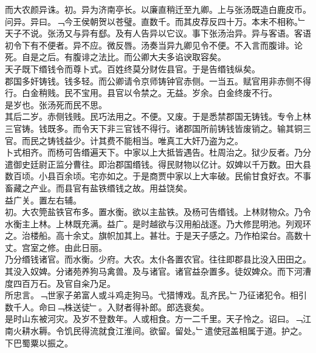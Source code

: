 \documentclass{zhvt-classic}
\begin{document}
\hspace*{2em}而大农颜异诛。初。异为济南亭长。以廉直稍迁至九卿。上与张汤既造白鹿皮币。问异。异曰。﹁今王侯朝贺以苍璧。直数千。而其皮荐反四十万。本末不相称。﹂天子不说。张汤又与异有郄。及有人告异以它议。事下张汤治异。异与客语。客语初令下有不便者。异不应。微反唇。汤奏当异九卿见令不便。不入言而腹诽。论死。自是之后。有腹诽之法比。而公卿大夫多谄谀取容矣。\\
\hspace*{2em}天子既下缗钱令而尊卜式。百姓终莫分财佐县官。于是告缗钱纵矣。\\
\hspace*{2em}郡国多奸铸钱。钱多轻。而公卿请令京师铸钟官赤侧。一当五。赋官用非赤侧不得行。白金稍贱。民不宝用。县官以令禁之。无益。岁余。白金终废不行。\\
\hspace*{2em}是岁也。张汤死而民不思。\\
\hspace*{2em}其后二岁。赤侧钱贱。民巧法用之。不便。又废。于是悉禁郡国无铸钱。专令上林三官铸。钱既多。而令天下非三官钱不得行。诸郡国所前铸钱皆废销之。输其铜三官。而民之铸钱益少。计其费不能相当。唯真工大奸乃盗为之。\\
\hspace*{2em}卜式相齐。而杨可告缗遍天下。中家以上大抵皆遇告。杜周治之。狱少反者。乃分遣御史廷尉正监分曹往。即治郡国缗钱。得民财物以亿计。奴婢以千万数。田大县数百顷。小县百余顷。宅亦如之。于是商贾中家以上大率破。民偷甘食好衣。不事畜藏之产业。而县官有盐铁缗钱之故。用益饶矣。\\
\hspace*{2em}益广关。置左右辅。\\
\hspace*{2em}初。大农筦盐铁官布多。置水衡。欲以主盐铁。及杨可告缗钱。上林财物众。乃令水衡主上林。上林既充满。益广。是时越欲与汉用船战逐。乃大修昆明池。列观环之。治楼船。高十余丈。旗帜加其上。甚壮。于是天子感之。乃作柏梁台。高数十丈。宫室之修。由此日丽。\\
\hspace*{2em}乃分缗钱诸官。而水衡。少府。大农。太仆各置农官。往往即郡县比没入田田之。其没入奴婢。分诸苑养狗马禽兽。及与诸官。诸官益杂置多。徒奴婢众。而下河漕度四百万石。及官自籴乃足。\\
\hspace*{2em}所忠言。﹁世家子弟富人或斗鸡走狗马。弋猎博戏。乱齐民。﹂乃征诸犯令。相引数千人。命曰﹁株送徒﹂。入财者得补郎。郎选衰矣。\\
\hspace*{2em}是时山东被河灾。及岁不登数年。人或相食。方一二千里。天子怜之。诏曰。﹁江南火耕水耨。令饥民得流就食江淮间。欲留。留处。﹂遣使冠盖相属于道。护之。下巴蜀粟以振之。\\
\end{document}
